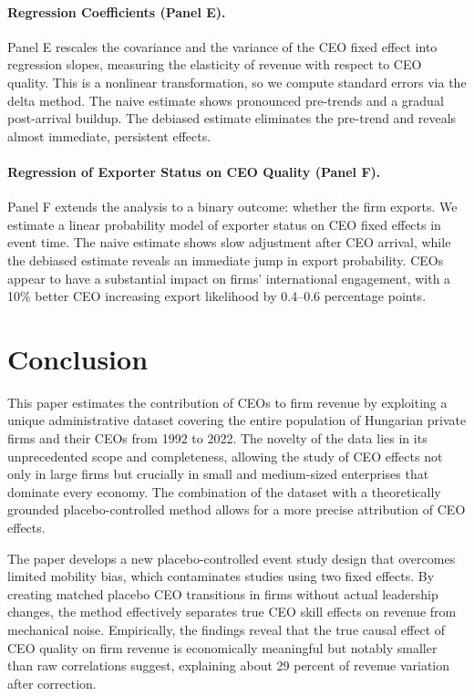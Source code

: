 \documentclass[11pt,a4paper]{article}
\begin{document}
\paragraph{Regression Coefficients (Panel E).} Panel E rescales the covariance and the variance of the CEO fixed effect into regression slopes, measuring the elasticity of revenue with respect to CEO quality. This is a nonlinear transformation, so we compute standard errors via the delta method. The naive estimate shows pronounced pre-trends and a gradual post-arrival buildup. The debiased estimate eliminates the pre-trend and reveals almost immediate, persistent effects. 

\paragraph{Regression of Exporter Status on CEO Quality (Panel F).} Panel F extends the analysis to a binary outcome: whether the firm exports. We estimate a linear probability model of exporter status on CEO fixed effects in event time. The naive estimate shows slow adjustment after CEO arrival, while the debiased estimate reveals an immediate jump in export probability. CEOs appear to have a substantial impact on firms' international engagement, with a 10\% better CEO increasing export likelihood by 0.4--0.6 percentage points.


\section{Conclusion}

This paper estimates the contribution of CEOs to firm revenue by exploiting a unique administrative dataset covering the entire population of Hungarian private firms and their CEOs from 1992 to 2022. The novelty of the data lies in its unprecedented scope and completeness, allowing the study of CEO effects not only in large firms but crucially in small and medium-sized enterprises that dominate every economy. The combination of the dataset with a theoretically grounded placebo-controlled method allows for a more precise attribution of CEO effects. 

The paper develops a new placebo-controlled event study design that overcomes limited mobility bias, which contaminates studies using two fixed effects.  By creating matched placebo CEO transitions in firms without actual leadership changes, the method effectively separates true CEO skill effects on revenue from mechanical noise. Empirically, the findings reveal that the true causal effect of CEO quality on firm revenue is economically meaningful but notably smaller than raw correlations suggest, explaining about 29 percent of revenue variation after correction. 
\end{document}
